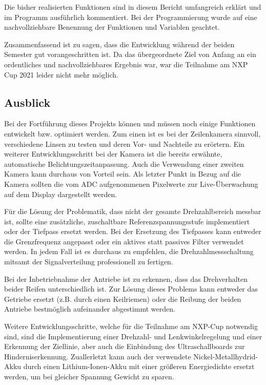 Die bisher realisierten Funktionen sind in diesem Bericht umfangreich erklärt und im Programm ausführlich kommentiert. Bei der Programmierung wurde auf eine nachvollziehbare Benennung der Funktionen und Variablen geachtet.\vspace{11pt}

Zusammenfassend ist zu sagen, dass die Entwicklung während der beiden Semester gut vorangeschritten ist. Da das übergeordnete Ziel von Anfang an ein ordentliches und nachvollziehbares Ergebnis war, war die Teilnahme am NXP Cup 2021 leider nicht mehr möglich.

\newpage
\subsection{Ausblick}\label{Sec11Sub2}

Bei der Fortführung dieses Projekts können und müssen noch einige Funktionen entwickelt bzw. optimiert werden. Zum einen ist es bei der Zeilenkamera sinnvoll, verschiedene Linsen zu testen und deren Vor- und Nachteile zu erörtern. Ein weiterer Entwicklungsschritt bei der Kamera ist die bereits erwähnte, automatische Belichtungszeitanpassung. Auch die Verwendung einer zweiten Kamera kann durchaus von Vorteil sein. Als letzter Punkt in Bezug auf die Kamera sollten die vom ADC aufgenommenen Pixelwerte zur Live-Überwachung auf dem Display dargestellt werden.\vspace{11pt}

Für die Lösung der Problematik, dass nicht der gesamte Drehzahlbereich messbar ist, sollte eine zusätzliche, zuschaltbare Referenzspannungsstufe implementiert oder der Tiefpass ersetzt werden. Bei der Ersetzung des Tiefpasses kann entweder die Grenzfrequenz angepasst oder ein aktives statt passives Filter verwendet werden. In jedem Fall ist es durchaus zu empfehlen, die Drehzahlmessschaltung mitsamt der Signalverteilung professionell zu fertigen.\vspace{11pt}

Bei der Inbetriebnahme der Antriebe ist zu erkennen, dass das Drehverhalten beider Reifen unterschiedlich ist. Zur Lösung dieses Problems kann entweder das Getriebe ersetzt (z.B. durch einen Keilriemen) oder die Reibung der beiden Antriebe bestmöglich aufeinander abgestimmt werden.\vspace{11pt}

Weitere Entwicklungsschritte, welche für die Teilnahme am NXP-Cup notwendig sind, sind die Implementierung einer Drehzahl- und Lenkwinkelregelung und einer Erkennung der Ziellinie, aber auch die Einbindung des Ultraschallboards zur Hinderniserkennung. Zuallerletzt kann auch der verwendete Nickel-Metallhydrid-Akku durch einen Lithium-Ionen-Akku mit einer größeren Energiedichte ersetzt werden, um bei gleicher Spannung Gewicht zu sparen.


\newpage
